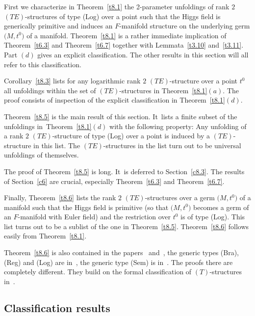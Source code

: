 \documentclass[10pt,a4paper]{amsart}
\numberwithin{equation}{section}
\numberwithin{figure}{section}
\begin{document}
First we characterize in Theorem~\ref{t8.1}
the 2-parameter unfoldings of rank $2$
$(TE)$-structures of type (Log) over a point such that
the Higgs field is generically primitive
and induces an $F$-manifold structure on the underlying
germ $\big(M,t^0\big)$ of a manifold.
Theorem~\ref{t8.1} is a rather imme\-diate
implication of Theorem~\ref{t6.3} and Theorem~\ref{t6.7}
together with Lemmata~\ref{t3.10} and~\ref{t3.11}.
Part $(d)$ gives an explicit classification.
The other results in this section will all refer
to this classification.

Corollary~\ref{t8.3} lists for any logarithmic rank $2$
$(TE)$-structure over a point $t^0$ all unfoldings within
the set of $(TE)$-structures in Theorem~\ref{t8.1}$(a)$.
The proof consists of inspection of the explicit
classification in Theorem~\ref{t8.1}$(d)$.

Theorem~\ref{t8.5} is the main result of this section. It~lists a finite subset of the unfoldings in~Theo\-rem~\ref{t8.1}$(d)$ with the following property:
Any unfolding of a rank $2$ $(TE)$-structure of type (Log)
over a point is induced by a $(TE)$-structure in this list.
The $(TE)$-structures in the list turn out to be
universal unfoldings of themselves.

The proof of Theorem~\ref{t8.5} is long. It~is deferred
to Section~\ref{c8.3}. The results of Section~\ref{c6}
are crucial, especially Theorem~\ref{t6.3} and
Theorem~\ref{t6.7}.

Finally, Theorem~\ref{t8.6} lists the rank $2$
$(TE)$-structures over a germ $\big(M,t^0\big)$ of a manifold
such that the Higgs field is primitive (so that $\big(M,t^0\big)$
becomes a germ of an $F$-manifold with Euler field)
and the restriction over $t^0$ is of type (Log).
This list turns out to be a sublist of the one in
Theorem~\ref{t8.5}.
Theorem~\ref{t8.6} follows easily from Theorem~\ref{t8.1}.

Theorem~\ref{t8.6} is also contained in the papers~\cite{DH20-3}
 and~\cite{DH20-2}, the generic types (Bra), (Reg) and (Log)
are in~\cite{DH20-3}, the generic type (Sem)
is in~\cite{DH20-2}.
The proofs there are completely different. They build on the
formal classification of $(T)$-structures in~\cite{DH20-1}.

\subsection{Classification results}\label{c8.1}
\end{document}
